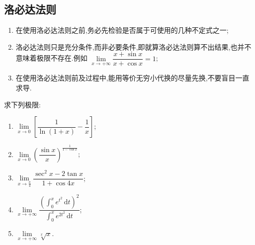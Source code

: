 \subsection{洛必达法则}

\begin{enumerate}
    \item 在使用洛必达法则之前,务必先检验是否属于可使用的几种不定式之一;
    \item 洛必达法则只是充分条件,而非必要条件,即就算洛必达法则算不出结果,也并不意味着极限不存在.例如
          $\displaystyle\lim\limits_{x\to+\infty}\dfrac{x+\sin x}{x+\cos x}=1$;
    \item 在使用洛必达法则前及过程中,能用等价无穷小代换的尽量先换,不要盲目一直求导.
\end{enumerate}

\begin{example}
    求下列极限:
    \begin{enumerate}
        \item $\displaystyle
                  \lim\limits_{x\to0}
                  \left[\dfrac{1}{\ln(1+x)}-\dfrac{1}{x}\right]$;
        \item $\displaystyle
                  \lim\limits_{x\to0}
                  \left(\dfrac{\sin x}{x}\right)^{\frac{1}{1-\cos x}}$;
        \item $\displaystyle
                  \lim\limits_{x\to\frac{\pi}{4}}
                  \dfrac{\sec^2x-2\tan x}{1+\cos4x}$;
        \item $\displaystyle
                  \lim\limits_{x\to+\infty}
                  \dfrac{\left(\int_0^x e^{t^2}\,\mathrm{d}t\right)^2}
                  {\int_0^x e^{2t^2}\,\mathrm{d}t}$;
        \item $\displaystyle
                  \lim\limits_{x\to+\infty}\sqrt[x]{x}$.
    \end{enumerate}
\end{example}
\exampleblank


